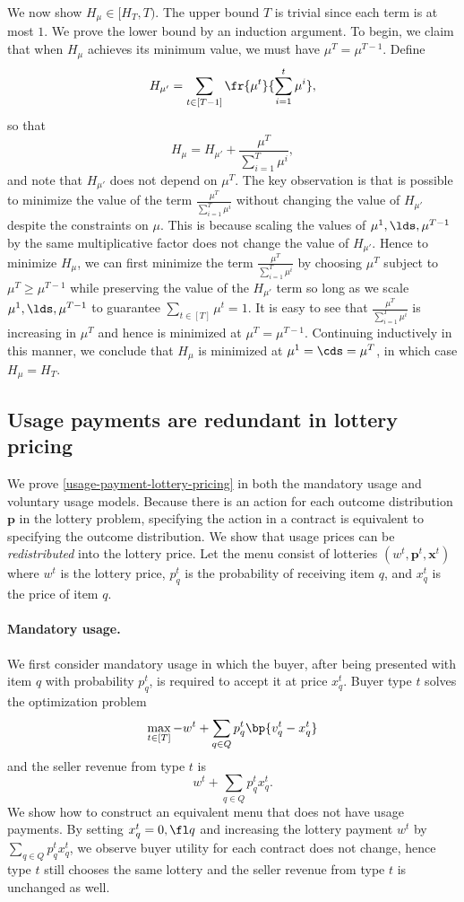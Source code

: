     We now show $H_\mu\in [H_T, T)$. The upper bound $T$ is trivial since each term is at most $1$. We prove the lower bound by an induction argument. To begin, we claim that when $H_\mu$ achieves its minimum value, we must have $\mu^T = \mu^{T-1}$. Define $$H_{\mu'} = \sum_{t\in [T-1]} \fr{\mu^t}{\sum_{i=1}^t \mu^i},$$ so that $$H_\mu = H_{\mu'} + \frac{\mu^T}{\sum_{i=1}^T \mu^i},$$ and note that $H_{\mu'}$ does not depend on $\mu^T$. The key observation is that is possible to minimize the value of the term $ \frac{\mu^T}{\sum_{i=1}^T \mu^i}$ without changing the value of $H_{\mu'}$ despite the constraints on $\mu$. This is because scaling the values of $\mu^1,\lds,\mu^{T-1}$ by the same multiplicative factor does not change the value of $H_{\mu'}$. Hence to minimize $H_\mu$, we can first minimize the term $\frac{\mu^T}{\sum_{i=1}^T \mu^i}$ by choosing $\mu^T$ subject to $\mu^T\ge \mu^{T-1}$ while preserving the value of the $H_{\mu'}$ term so long as we scale $\mu^1,\lds,\mu^{T-1}$ to guarantee $\sum_{t\in [T]} \mu^t = 1$. It is easy to see that $\frac{\mu^T}{\sum_{i=1}^T \mu^i}$ is increasing in $\mu^T$ and hence is minimized at $\mu^T = \mu^{T-1}$. Continuing inductively in this manner, we conclude that $H_\mu$ is minimized at $\mu^1 = \cds = \mu^T$, in which case $H_\mu = H_T$.

\subsection{Usage payments are redundant in lottery pricing} \label{proof-usage-payment-lottery-pricing}
 
We prove \cref{usage-payment-lottery-pricing} in both the mandatory usage and voluntary usage models. Because there is an action for each outcome distribution $\mathbf{p}$ in the lottery problem, specifying the action in a contract is equivalent to specifying the outcome distribution. We show that usage prices can be \emph{redistributed} into the lottery price. Let the menu consist of lotteries $(w^t, \mathbf{p}^t, \mathbf{x}^t)$ where $w^t$ is the lottery price, $p^t_q$ is the probability of receiving item $q$, and $x^t_q$ is the price of item $q$.

\paragraph{Mandatory usage.} We first consider mandatory usage in which the buyer, after being presented with item $q$ with probability $p^t_q$, is required to accept it at price $x^t_q$. Buyer type $t$ solves the optimization problem $$\max_{t\in [T]} -w^t+ \sum_{q\in Q} p^t_q \bp{v^t_q - x^t_q}$$ and the seller revenue from type $t$ is $$w^t + \sum_{q\in Q} p^t_q x^t_q.$$ We show how to construct an equivalent menu that does not have usage payments. By setting $x^t_q = 0,\fl q$ and increasing the lottery payment $w^t$ by $\sum_{q\in Q} p^t_q x^t_q$, we observe buyer utility for each contract does not change, hence type $t$ still chooses the same lottery and the seller revenue from type $t$ is unchanged as well.

